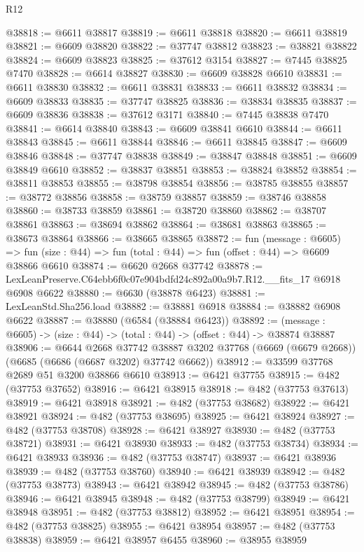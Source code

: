 \begin{lexlean}{R12}
\begin{coremodule}
@38818 := @6611 @38817
@38819 := @6611 @38818
@38820 := @6611 @38819
@38821 := @6609 @38820
@38822 := @37747 @38812
@38823 := @38821 @38822
@38824 := @6609 @38823
@38825 := @37612 @3154
@38827 := @7445 @38825 @7470
@38828 := @6614 @38827
@38830 := @6609 @38828 @6610
@38831 := @6611 @38830
@38832 := @6611 @38831
@38833 := @6611 @38832
@38834 := @6609 @38833
@38835 := @37747 @38825
@38836 := @38834 @38835
@38837 := @6609 @38836
@38838 := @37612 @3171
@38840 := @7445 @38838 @7470
@38841 := @6614 @38840
@38843 := @6609 @38841 @6610
@38844 := @6611 @38843
@38845 := @6611 @38844
@38846 := @6611 @38845
@38847 := @6609 @38846
@38848 := @37747 @38838
@38849 := @38847 @38848
@38851 := @6609 @38849 @6610
@38852 := @38837 @38851
@38853 := @38824 @38852
@38854 := @38811 @38853
@38855 := @38798 @38854
@38856 := @38785 @38855
@38857 := @38772 @38856
@38858 := @38759 @38857
@38859 := @38746 @38858
@38860 := @38733 @38859
@38861 := @38720 @38860
@38862 := @38707 @38861
@38863 := @38694 @38862
@38864 := @38681 @38863
@38865 := @38673 @38864
@38866 := @38665 @38865
@38872 := fun (message : @6605) =>
  fun (size : @44) => fun (total : @44) => fun (offset : @44) => @6609 @38866 @6610
@38874 := @6620 @2668 @37742
@38878 := LexLeanPreserve.C64ebb6f0c07e904bdfd24c892a00a9b7.R12.__fits_17 @6918 @6908 @6622
@38880 := @6630 (@38878 @6423)
@38881 := LexLeanStd.Sha256.load
@38882 := @38881 @6918
@38884 := @38882 @6908 @6622
@38887 := @38880 (@6584 (@38884 @6423))
@38892 := (message : @6605) -> (size : @44) -> (total : @44) -> (offset : @44) -> @38874 @38887
@38906 := @6644
    @2668
    @37742
    @38887
    @3202
    @37768
    (@6669 (@6679 @2668))
    (@6685 (@6686 (@6687 @3202) @37742 @6662))
@38912 := @33599 @37768 @2689 @51 @3200 @38866 @6610
@38913 := @6421 @37755
@38915 := @482 (@37753 @37652)
@38916 := @6421 @38915
@38918 := @482 (@37753 @37613)
@38919 := @6421 @38918
@38921 := @482 (@37753 @38682)
@38922 := @6421 @38921
@38924 := @482 (@37753 @38695)
@38925 := @6421 @38924
@38927 := @482 (@37753 @38708)
@38928 := @6421 @38927
@38930 := @482 (@37753 @38721)
@38931 := @6421 @38930
@38933 := @482 (@37753 @38734)
@38934 := @6421 @38933
@38936 := @482 (@37753 @38747)
@38937 := @6421 @38936
@38939 := @482 (@37753 @38760)
@38940 := @6421 @38939
@38942 := @482 (@37753 @38773)
@38943 := @6421 @38942
@38945 := @482 (@37753 @38786)
@38946 := @6421 @38945
@38948 := @482 (@37753 @38799)
@38949 := @6421 @38948
@38951 := @482 (@37753 @38812)
@38952 := @6421 @38951
@38954 := @482 (@37753 @38825)
@38955 := @6421 @38954
@38957 := @482 (@37753 @38838)
@38959 := @6421 @38957 @6455
@38960 := @38955 @38959

\end{coremodule}
\end{lexlean}
